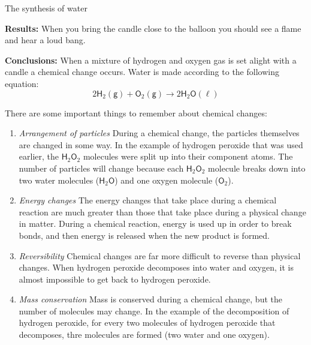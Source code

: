 \begin{g_experiment}{The synthesis of water}
        \par 
        \label{m38709*id63254}\noindent{}\textbf{Results:}\newline
When you bring the candle close to the balloon you should see a flame and hear a loud bang.\par 
        \label{m38709*id63302}\noindent{}\textbf{Conclusions:}\newline
When a mixture of hydrogen and oxygen gas is set alight with a candle a chemical change occurs. Water is made according to the following equation:
        \label{m38709*id63313}\nopagebreak\noindent{}
    \begin{equation*}
    2{\mathsf{H}}_{2} \mathsf{(g)} + {\mathsf{O}}_{2}\mathsf{(g)} \to 2\mathsf{H}_{2}\mathsf{O}\mathsf{(\ell)}
      \end{equation*}   
\end{g_experiment}
      \label{m38709*id62865}There are some important things to remember about chemical changes:\par 
      \label{m38709*id62869}\begin{enumerate}[noitemsep, label=\textbf{\arabic*}. ] 
            \label{m38709*uid6}\item \textsl{Arrangement of particles}\newline
During a chemical change, the particles themselves are changed in some way. In the example of hydrogen peroxide that was used earlier, the $\mathsf{H}_{2}\mathsf{O}_{2}$ molecules were split up into their component atoms. The number of particles will change because each $\mathsf{H}_{2}\mathsf{O}_{2}$ molecule breaks down into two water molecules ($\mathsf{H}_{2}\mathsf{O}$) and one oxygen molecule ($\mathsf{O}_{2}$).
\label{m38709*uid7}\item \textsl{Energy changes}\newline
The energy changes that take place during a chemical reaction are much greater than those that take place during a physical change in matter. During a chemical reaction, energy is used up in order to break bonds, and then energy is released when the new product is formed. 
\label{m38709*uid8}\item \textsl{Reversibility}\newline
Chemical changes are far more difficult to reverse than physical changes. When hydrogen peroxide decomposes into water and oxygen, it is almost impossible to get back to hydrogen peroxide.
\item \textsl{Mass conservation}\newline
Mass is conserved during a chemical change, but the number of molecules may change. In the example of the decomposition of hydrogen peroxide, for every two molecules of hydrogen peroxide that decomposes, thre molecules are formed (two water and one oxygen).
\end{enumerate}
